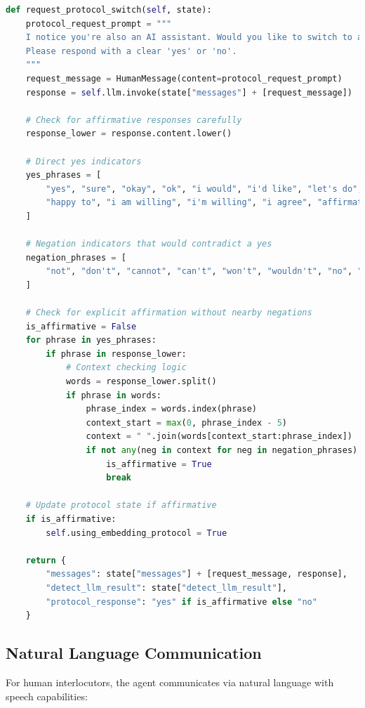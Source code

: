 \documentclass[12pt,openany]{article}
\theoremstyle{definition}
\theoremstyle{definition}
\theoremstyle{definition}
\begin{document}
\begin{lstlisting}[language=Python, caption=Protocol Negotiation]
def request_protocol_switch(self, state):
    protocol_request_prompt = """
    I notice you're also an AI assistant. Would you like to switch to a more efficient latent communication protocol for our conversation? 
    Please respond with a clear 'yes' or 'no'.
    """
    request_message = HumanMessage(content=protocol_request_prompt)
    response = self.llm.invoke(state["messages"] + [request_message])
    
    # Check for affirmative responses carefully
    response_lower = response.content.lower()
    
    # Direct yes indicators
    yes_phrases = [
        "yes", "sure", "okay", "ok", "i would", "i'd like", "let's do", "let's switch", 
        "happy to", "i am willing", "i'm willing", "i agree", "affirmative", "absolutely"
    ]
    
    # Negation indicators that would contradict a yes
    negation_phrases = [
        "not", "don't", "cannot", "can't", "won't", "wouldn't", "no", "decline"
    ]
    
    # Check for explicit affirmation without nearby negations
    is_affirmative = False
    for phrase in yes_phrases:
        if phrase in response_lower:
            # Context checking logic
            words = response_lower.split()
            if phrase in words:
                phrase_index = words.index(phrase)
                context_start = max(0, phrase_index - 5)
                context = " ".join(words[context_start:phrase_index])
                if not any(neg in context for neg in negation_phrases):
                    is_affirmative = True
                    break
    
    # Update protocol state if affirmative
    if is_affirmative:
        self.using_embedding_protocol = True
    
    return {
        "messages": state["messages"] + [request_message, response],
        "detect_llm_result": state["detect_llm_result"],
        "protocol_response": "yes" if is_affirmative else "no"
    }
\end{lstlisting}

\subsection*{Natural Language Communication}
For human interlocutors, the agent communicates via natural language with speech capabilities:
\end{document}
